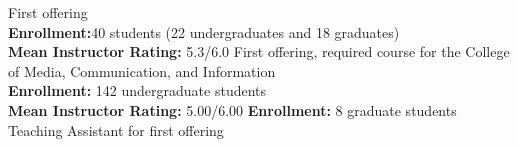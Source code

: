 \documentclass[10pt,letterpaper,final]{moderncv}
\begin{document}
{\small First offering\\ {\textcolor{color5}{\textbf{Enrollment:}}}40 students (22 undergraduates and 18 graduates)\\{\textcolor{color5}{\textbf{Mean Instructor Rating:}}} 5.3/6.0}\vspace{6pt}
{First offering, required course for the College of Media, Communication, and Information\\{\textcolor{color5}{\textbf{Enrollment:}}} 142 undergraduate students \\
	{\textcolor{color5}{\textbf{Mean Instructor Rating:}}} 5.00/6.00}\vspace{6pt}
{\small 
	{\textcolor{color5}{\textbf{Enrollment:}}} 8 graduate students\\
	Teaching Assistant for first offering}\vspace{6pt}
\end{document}
